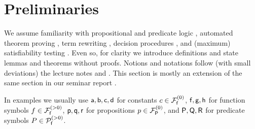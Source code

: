 
\section{Preliminaries}

We assume familiarity with propositional and predicate logic \cite{Huth:2004:LCS:975331}, 
automated theorem proving \cite{Fitting:1996:FLA:230183}, 
term rewriting \cite{Baader:1998:TR:280474}, 
decision procedures \cite{Kroening:2008:DPA:1391237}, 
and (maximum) satisfiability testing \cite{Biere:2009:HSV:1550723}.
Even so, for clarity we introduce
definitions and state lemmas and theorems without proofs.
Notions and notations follow (with small deviations) the lecture notes \cite{AM2015tr} and \cite{GM2013ar}.
This section is mostly an extension of the same section in our seminar report \cite{axm:SR2}.





In examples we usually use ${\mathsf a},{\mathsf b},{\mathsf c},{\mathsf d}$ for constants $c\in{{\mathcal F}_{\mathsf f}^{(0)}}$,
${\mathsf f},{\mathsf g},{\mathsf h}$ for function symbols $f\in{{\mathcal F}_{\mathsf f}^{(>0)}}$,
${\mathsf p},{\mathsf q},{\mathsf r}$ for propositions $p\in{{\mathcal F}_{\mathsf P}^{(0)}}$, and 
${\mathsf P},{\mathsf Q},{\mathsf R}$ for predicate symbols $P\in{{\mathcal P}_{\mathsf f}^{(>0)}}$.



